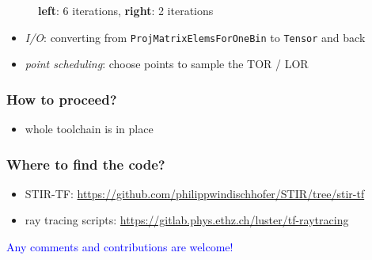 \documentclass{beamer}
\begin{document}
\begin{frame}
  \frametitle{}
  \begin{figure}
    \centering
      \caption{\textbf{left}: 6 iterations, \textbf{right}: 2 iterations}
  \end{figure}

  \begin{itemize}
    \item \textsl{I/O}: converting from \texttt{ProjMatrixElemsForOneBin} to \texttt{Tensor} and back
    \item \textsl{point scheduling}: choose points to sample the TOR / LOR
  \end{itemize}
\end{frame}


\begin{frame}
  \frametitle{How to proceed?}
  \begin{itemize}
    \item whole toolchain is in place
  \end{itemize}
\end{frame}

\begin{frame}
  \frametitle{Where to find the code?}
  \begin{itemize}
    \item STIR-TF: \url{https://github.com/philippwindischhofer/STIR/tree/stir-tf}
    \item ray tracing scripts: \url{https://gitlab.phys.ethz.ch/luster/tf-raytracing}
  \end{itemize}

  \begin{center}
    \textcolor{blue}{Any comments and contributions are welcome!}
  \end{center}

\end{frame}
\end{document}
